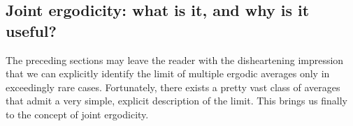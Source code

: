 \documentclass[11pt]{amsart}
\theoremstyle{definition}
\newtheorem{definition}[lemma]{Definition}
\DeclareMathOperator*{\E}{\mathbb{E}}
\newcommand{\N}{{\mathbb N}}
\newcommand{\R}{{\mathbb R}}
\newcommand{\CX}{{\mathcal X}}
\newcommand{\norm}[1]{\left\Vert #1\right\Vert}
\newcommand{\1}{{\mathbf{1}}}
\newcommand{\floor}[1]{{\left \lfloor #1 \right \rfloor}}
\begin{document}
\subsection{Joint ergodicity: what is it, and why is it useful?}
The preceding sections may leave the reader with the disheartening impression that we can explicitly identify the limit of multiple ergodic averages only in exceedingly rare cases. Fortunately, there exists a pretty vast class of averages that admit a very simple, explicit description of the limit. This brings us finally to the concept of joint ergodicity. %
\end{document}
